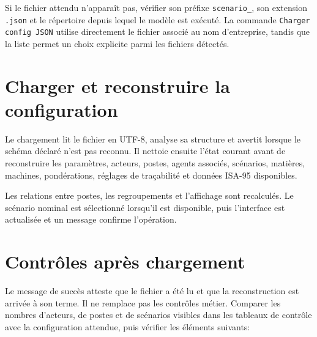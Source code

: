 

Si le fichier attendu n'apparaît pas, vérifier son préfixe \texttt{scenario\_}, son extension \texttt{.json} et le répertoire depuis lequel le modèle est exécuté. La commande \texttt{Charger config JSON} utilise directement le fichier associé au nom d'entreprise, tandis que la liste permet un choix explicite parmi les fichiers détectés.

\section{Charger et reconstruire la configuration}

Le chargement lit le fichier en UTF-8, analyse sa structure et avertit lorsque le schéma déclaré n'est pas reconnu. Il nettoie ensuite l'état courant avant de reconstruire les paramètres, acteurs, postes, agents associés, scénarios, matières, machines, pondérations, réglages de traçabilité et données ISA-95 disponibles.

Les relations entre postes, les regroupements et l'affichage sont recalculés. Le scénario nominal est sélectionné lorsqu'il est disponible, puis l'interface est actualisée et un message confirme l'opération.



\section{Contrôles après chargement}

Le message de succès atteste que le fichier a été lu et que la reconstruction est arrivée à son terme. Il ne remplace pas les contrôles métier. Comparer les nombres d'acteurs, de postes et de scénarios visibles dans les tableaux de contrôle avec la configuration attendue, puis vérifier les éléments suivants:

